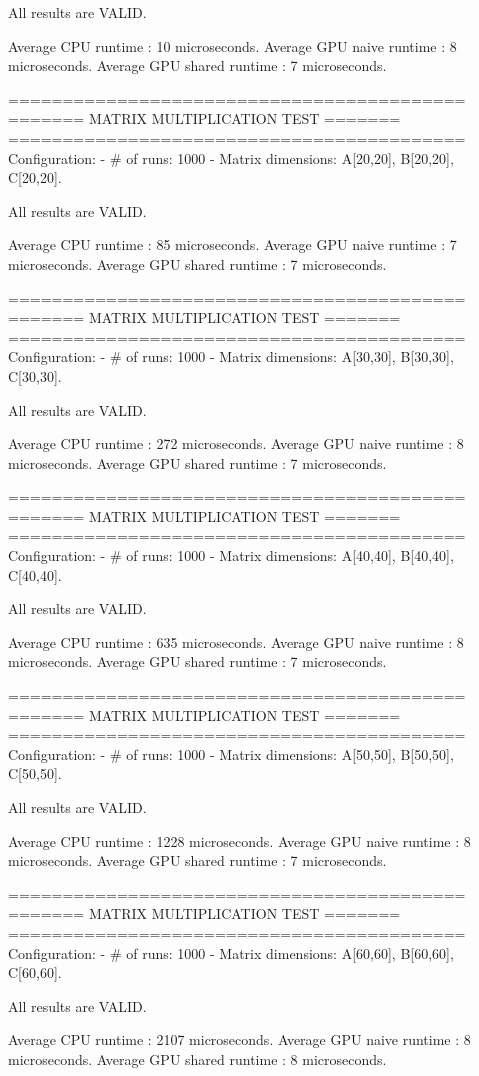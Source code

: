 All results are VALID.

Average CPU runtime        : 10 microseconds.
Average GPU naive runtime  : 8 microseconds.
Average GPU shared runtime : 7 microseconds.

==========================================
======= MATRIX MULTIPLICATION TEST =======
==========================================
Configuration:
 - # of runs: 1000
 - Matrix dimensions: A[20,20], B[20,20], C[20,20].

All results are VALID.

Average CPU runtime        : 85 microseconds.
Average GPU naive runtime  : 7 microseconds.
Average GPU shared runtime : 7 microseconds.

==========================================
======= MATRIX MULTIPLICATION TEST =======
==========================================
Configuration:
 - # of runs: 1000
 - Matrix dimensions: A[30,30], B[30,30], C[30,30].

All results are VALID.

Average CPU runtime        : 272 microseconds.
Average GPU naive runtime  : 8 microseconds.
Average GPU shared runtime : 7 microseconds.

==========================================
======= MATRIX MULTIPLICATION TEST =======
==========================================
Configuration:
 - # of runs: 1000
 - Matrix dimensions: A[40,40], B[40,40], C[40,40].

All results are VALID.

Average CPU runtime        : 635 microseconds.
Average GPU naive runtime  : 8 microseconds.
Average GPU shared runtime : 7 microseconds.

==========================================
======= MATRIX MULTIPLICATION TEST =======
==========================================
Configuration:
 - # of runs: 1000
 - Matrix dimensions: A[50,50], B[50,50], C[50,50].

All results are VALID.

Average CPU runtime        : 1228 microseconds.
Average GPU naive runtime  : 8 microseconds.
Average GPU shared runtime : 7 microseconds.

==========================================
======= MATRIX MULTIPLICATION TEST =======
==========================================
Configuration:
 - # of runs: 1000
 - Matrix dimensions: A[60,60], B[60,60], C[60,60].

All results are VALID.

Average CPU runtime        : 2107 microseconds.
Average GPU naive runtime  : 8 microseconds.
Average GPU shared runtime : 8 microseconds.

